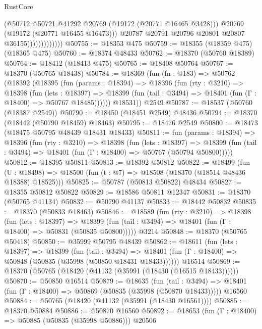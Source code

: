 \begin{lexlean}{RustCore}
\begin{coremodule}
                                (@50712 @50721 @41292 @20769 (@19172 (@20771 @16465 @3428)))
                                @20769
                                (@19172 (@20771 @16455 @16473)))
                              @20787
                              @20791
                              @20796
                              @20801
                              @20807
                              @36155)))))))))))))
@50755 := @18353 @475
@50759 := @18355 (@18359 @475) (@18365 @475)
@50760 := @18374 @48433
@50762 := @18370 (@50760 @18389)
@50764 := @18412 (@18413 @475)
@50765 := @18408 @50764
@50767 := @18370 (@50765 @18438)
@50784 := @18369
    (fun (fn : @183) =>
    @50762
      (@18392
        (@18395
          (fun (params : @18394) =>
          @18396
            (fun (rty : @3210) =>
            @18398
              (fun (lets : @18397) =>
              @18399 (fun (tail : @3494) => @18401 (fun (Γ : @18400) => @50767 @18485))))))
        @18531))
    @2549
@50787 := @18537 (@50760 (@18387 @2549))
@50790 := @18450 (@18451 @2549) @48436
@50794 := @18370 (@18442 (@50790 @18459) @18463)
@50795 := @18476 @2549
@50800 := @18473 (@18475 @50795 @48439 @18431 @18433)
@50811 := fun (params : @18394) =>
  @18396
    (fun (rty : @3210) =>
    @18398
      (fun (lets : @18397) =>
      @18399 (fun (tail : @3494) => @18401 (fun (Γ : @18400) => @50767 (@50794 @50800)))))
@50812 := @18395 @50811
@50813 := @18392 @50812
@50822 := @18499
    (fun (U : @18498) => @18500 (fun (t : @7) => @18508 (@18370 (@18514 @48436 @18388) @18525)))
@50825 := @50787 (@50813 @50822) @48434
@50827 := @18355 @50812 @50822
@50829 := @18586 @50811 @12347
@50831 := @18370 (@50765 @41134)
@50832 := @50790 @41137
@50833 := @18442 @50832
@50835 := @18370 (@50833 @18463)
@50846 := @18589
    (fun (rty : @3210) =>
    @18398
      (fun (lets : @18397) =>
      @18399 (fun (tail : @3494) => @18401 (fun (Γ : @18400) => @50831 (@50835 @50800)))))
    @3214
@50848 := @18370 (@50765 @50418)
@50850 := @35999 @50795 @48439
@50862 := @18611
    (fun (lets : @18397) =>
    @18399
      (fun (tail : @3494) =>
      @18401 (fun (Γ : @18400) => @50848 (@50835 (@35998 (@50850 @18431 @18433))))))
    @16514
@50869 := @18370 (@50765 (@18420 (@41132 (@35991 (@18430 (@16515 @18433))))))
@50870 := @50850 @16514
@50879 := @18635
    (fun (tail : @3494) => @18401 (fun (Γ : @18400) => @50869 (@50835 (@35998 (@50870 @18433)))))
    @16560
@50884 := @50765 (@18420 (@41132 (@35991 (@18430 @16561))))
@50885 := @18370 @50884
@50886 := @50870 @16560
@50892 := @18653 (fun (Γ : @18400) => @50885 (@50835 (@35998 @50886))) @20506

\end{coremodule}
\end{lexlean}
